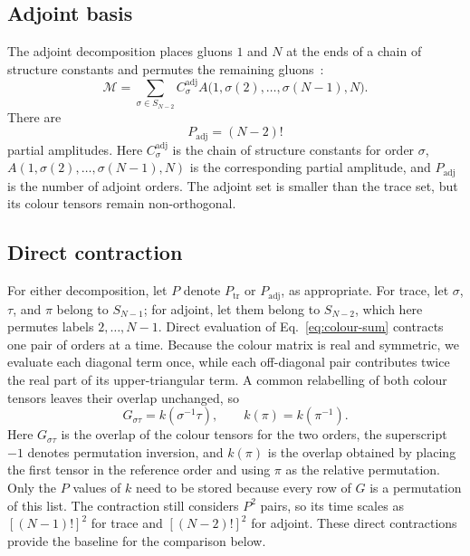 \documentclass[aps,prd,twocolumn,superscriptaddress,nofootinbib]{revtex4-2}
\begin{document}
\subsection{Adjoint basis}

The adjoint decomposition places gluons $1$ and $N$ at the ends of a chain of
structure constants and permutes the remaining gluons~\cite{DelDuca:1999rs}:
\begin{equation}
  \mathcal M
  =\sum_{\sigma\in S_{N-2}}
   C^{\mathrm{adj}}_{\sigma}
   A\bigl(1,\sigma(2),\ldots,\sigma(N-1),N\bigr).
  \label{eq:adjoint-decomposition}
\end{equation}
There are
\begin{equation}
  P_{\mathrm{adj}}=(N-2)!
  \label{eq:adjoint-size}
\end{equation}
partial amplitudes.  Here $C^{\mathrm{adj}}_\sigma$ is the chain of structure
constants for order $\sigma$,
$A(1,\sigma(2),\ldots,\sigma(N-1),N)$ is the corresponding partial amplitude,
and $P_{\mathrm{adj}}$ is the number of adjoint orders.  The adjoint set is
smaller than the trace set, but its colour tensors remain non-orthogonal.

\subsection{Direct contraction}

For either decomposition, let $P$ denote $P_{\mathrm{tr}}$ or
$P_{\mathrm{adj}}$, as appropriate.  For trace, let $\sigma$, $\tau$, and
$\pi$ belong to $S_{N-1}$; for adjoint, let them belong to $S_{N-2}$, which
here permutes labels $2,\ldots,N-1$.  Direct evaluation of
Eq.~\eqref{eq:colour-sum} contracts one pair of orders at a time.  Because the
colour matrix is real and symmetric, we evaluate each diagonal term once,
while each off-diagonal pair contributes twice the real part of its
upper-triangular term.  A common relabelling of both colour tensors leaves
their overlap unchanged, so
\begin{equation}
  G_{\sigma\tau}=k(\sigma^{-1}\tau),
  \qquad k(\pi)=k(\pi^{-1}).
  \label{eq:relative-permutation}
\end{equation}
Here $G_{\sigma\tau}$ is the overlap of the colour tensors for the two orders,
the superscript $-1$ denotes permutation inversion, and $k(\pi)$ is the
overlap obtained by placing the first tensor in the reference order and using
$\pi$ as the relative permutation.  Only the $P$ values of $k$ need to be
stored because every row of $G$ is a permutation of this list.  The
contraction still considers $P^2$ pairs, so its time scales as $[(N-1)!]^2$
for trace and $[(N-2)!]^2$ for adjoint.  These direct contractions provide the
baseline for the comparison below.
\end{document}
